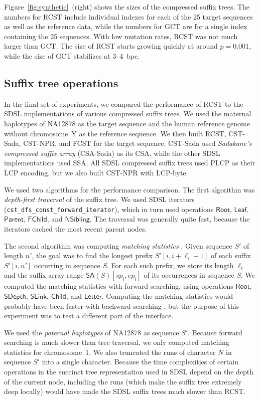 \documentclass[a4paper,11pt]{llncs}
\newcommand{\CSTsada}{\textsf{CST\nobreakdash-Sada}}
\newcommand{\GCT}{\textsf{GCT}}
\newcommand{\FCST}{\textsf{FCST}}
\newcommand{\CSTnpr}{\textsf{CST\nobreakdash-NPR}}
\newcommand{\RCST}{\textsf{RCST}}
\newcommand{\CSA}{\textsf{CSA}}
\newcommand{\SSA}{\textsf{SSA}}
\newcommand{\CSAsada}{\textsf{CSA-Sada}}
\newcommand{\mSA}{\ensuremath{\mathsf{SA}}}
\newcommand{\LCP}{\textsf{LCP}}
\newcommand{\PLCP}{\textsf{PLCP}}
\newcommand{\LCPbyte}{\textsf{LCP\nobreakdash-byte}}
\newcommand{\mRoot}{\ensuremath{\mathsf{Root}}}
\newcommand{\mLeaf}{\ensuremath{\mathsf{Leaf}}}
\newcommand{\mParent}{\ensuremath{\mathsf{Parent}}}
\newcommand{\mFChild}{\ensuremath{\mathsf{FChild}}}
\newcommand{\mNSibling}{\ensuremath{\mathsf{NSibling}}}
\newcommand{\mSDepth}{\ensuremath{\mathsf{SDepth}}}
\newcommand{\mSLink}{\ensuremath{\mathsf{SLink}}}
\newcommand{\mChild}{\ensuremath{\mathsf{Child}}}
\newcommand{\mLetter}{\ensuremath{\mathsf{Letter}}}
\begin{document}
Figure~\ref{fig:synthetic}~(right) shows the sizes of the compressed suffix
trees. The numbers for \RCST{} include individual indexes for each of the 25
target sequences as well as the reference data, while the numbers for \GCT{}
are for a single index containing the 25 sequences. With low mutation rates,
\RCST{} was not much larger than \GCT{}. The size of \RCST{} starts growing
quickly at around $p = 0.001$, while the size of \GCT{} stabilizes at
3\nobreakdash--4~bpc.

\subsection{Suffix tree operations}

In the final set of experiments, we compared the performance of \RCST{} to the
SDSL implementations of various compressed suffix trees. We used the maternal
haplotypes of NA12878 as the target sequence and the human reference genome
without chromosome~Y as the reference sequence. We then built \RCST, \CSTsada,
\CSTnpr, and \FCST{} for the target sequence. \CSTsada{} used \emph{Sadakane's
compressed suffix array} (\CSAsada) \cite{Sadakane2003} as its \CSA, while the
other SDSL implementations used \SSA. All SDSL compressed suffix trees used
\PLCP{} as their \LCP{} encoding, but we also built \CSTnpr{} with \LCPbyte.

We used two algorithms for the performance comparison. The first algorithm was
\emph{depth-first traversal} of the suffix tree. We used SDSL iterators
(\texttt{cst\_dfs\_const\_forward\_iterator}), which in turn used operations
$\mRoot$, $\mLeaf$, $\mParent$, $\mFChild$, and $\mNSibling$. The traversal
was generally quite fast, because the iterators cached the most recent parent
nodes.

The second algorithm was computing \emph{matching statistics}
\cite{Chang1994}. Given sequence $S'$ of length $n'$, the goal was to find the
longest prefix $S'[i,i+\ell_{i}-1]$ of each suffix $S'[i,n']$ occurring in
sequence $S$. For each such prefix, we store its length $\ell_{i}$ and the
suffix array range $\mSA(S)[sp_{i},ep_{i}]$ of its occurrences in sequence
$S$. We computed the matching statistics with forward searching, using
operations $\mRoot$, $\mSDepth$, $\mSLink$, $\mChild$, and $\mLetter$.
Computing the matching statistics would probably have been faster with
backward searching \cite{Ohlebusch2010a}, but the purpose of this experiment
was to test a different part of the interface.

We used the \emph{paternal haplotypes} of NA12878 as sequence $S'$. Because
forward searching is much slower than tree traversal, we only computed
matching statistics for chromosome~1. We also truncated the runs of character
$N$ in sequence $S'$ into a single character. Because the time complexities of
certain operations in the succinct tree representation used in SDSL depend on
the depth of the current node, including the runs (which make the suffix tree
extremely deep locally) would have made the SDSL suffix trees much slower than
\RCST.
\end{document}
